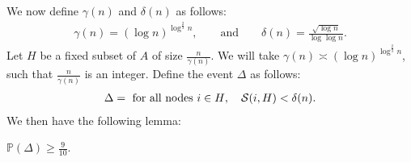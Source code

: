 We now define $\gamma(n)$ and $\delta(n)$ as follows:
\begin{align*}
\gamma(n) = (\log n)^{\log^{\frac{2}{3}} n}, \qquad \text{and} \qquad \delta(n) = \frac{\sqrt{\log n}}{\log \log n}.
\end{align*}
 Let $H$ be a fixed subset of $A$ of size $\frac{n}{\gamma(n)}$. We will take $\gamma(n) \asymp (\log n)^{\log^{\frac{2}{3}} n}$, such that $\frac{n}{\gamma(n)}$ is an integer. Define the event $\Delta$ as follows:
\begin{align*}
\Delta = \text{ for all nodes $i \in H$}, \quad  {\cal S}(i, H) < \delta(n).
\end{align*}
We then have the following lemma:
\begin{lemma} \label{lemma: delta}
$\mathbb P(\Delta) \geq \frac{9}{10}$.
\end{lemma}
